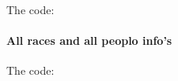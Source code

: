 \documentclass[a4paper,10pt,english]{sphinxmanual}
\begin{document}
The code:
\begin{quote}

\end{quote}


\paragraph{All races and all peoplo info's}
\label{developer/member2:all-races-and-all-peoplo-info-s}\begin{quote}

\end{quote}

The code:
\begin{quote}

\end{quote}
\end{document}
